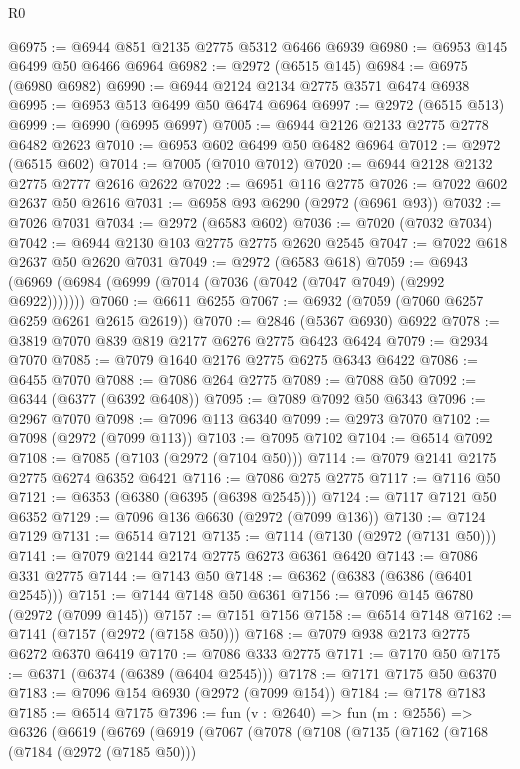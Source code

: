 \begin{lexlean}{R0}
\begin{coremodule}
@6975 := @6944 @851 @2135 @2775 @5312 @6466 @6939
@6980 := @6953 @145 @6499 @50 @6466 @6964
@6982 := @2972 (@6515 @145)
@6984 := @6975 (@6980 @6982)
@6990 := @6944 @2124 @2134 @2775 @3571 @6474 @6938
@6995 := @6953 @513 @6499 @50 @6474 @6964
@6997 := @2972 (@6515 @513)
@6999 := @6990 (@6995 @6997)
@7005 := @6944 @2126 @2133 @2775 @2778 @6482 @2623
@7010 := @6953 @602 @6499 @50 @6482 @6964
@7012 := @2972 (@6515 @602)
@7014 := @7005 (@7010 @7012)
@7020 := @6944 @2128 @2132 @2775 @2777 @2616 @2622
@7022 := @6951 @116 @2775
@7026 := @7022 @602 @2637 @50 @2616
@7031 := @6958 @93 @6290 (@2972 (@6961 @93))
@7032 := @7026 @7031
@7034 := @2972 (@6583 @602)
@7036 := @7020 (@7032 @7034)
@7042 := @6944 @2130 @103 @2775 @2775 @2620 @2545
@7047 := @7022 @618 @2637 @50 @2620 @7031
@7049 := @2972 (@6583 @618)
@7059 := @6943 (@6969 (@6984 (@6999 (@7014 (@7036 (@7042 (@7047 @7049) (@2992 @6922)))))))
@7060 := @6611 @6255
@7067 := @6932 (@7059 (@7060 @6257 @6259 @6261 @2615 @2619))
@7070 := @2846 (@5367 @6930) @6922
@7078 := @3819 @7070 @839 @819 @2177 @6276 @2775 @6423 @6424
@7079 := @2934 @7070
@7085 := @7079 @1640 @2176 @2775 @6275 @6343 @6422
@7086 := @6455 @7070
@7088 := @7086 @264 @2775
@7089 := @7088 @50
@7092 := @6344 (@6377 (@6392 @6408))
@7095 := @7089 @7092 @50 @6343
@7096 := @2967 @7070
@7098 := @7096 @113 @6340
@7099 := @2973 @7070
@7102 := @7098 (@2972 (@7099 @113))
@7103 := @7095 @7102
@7104 := @6514 @7092
@7108 := @7085 (@7103 (@2972 (@7104 @50)))
@7114 := @7079 @2141 @2175 @2775 @6274 @6352 @6421
@7116 := @7086 @275 @2775
@7117 := @7116 @50
@7121 := @6353 (@6380 (@6395 (@6398 @2545)))
@7124 := @7117 @7121 @50 @6352
@7129 := @7096 @136 @6630 (@2972 (@7099 @136))
@7130 := @7124 @7129
@7131 := @6514 @7121
@7135 := @7114 (@7130 (@2972 (@7131 @50)))
@7141 := @7079 @2144 @2174 @2775 @6273 @6361 @6420
@7143 := @7086 @331 @2775
@7144 := @7143 @50
@7148 := @6362 (@6383 (@6386 (@6401 @2545)))
@7151 := @7144 @7148 @50 @6361
@7156 := @7096 @145 @6780 (@2972 (@7099 @145))
@7157 := @7151 @7156
@7158 := @6514 @7148
@7162 := @7141 (@7157 (@2972 (@7158 @50)))
@7168 := @7079 @938 @2173 @2775 @6272 @6370 @6419
@7170 := @7086 @333 @2775
@7171 := @7170 @50
@7175 := @6371 (@6374 (@6389 (@6404 @2545)))
@7178 := @7171 @7175 @50 @6370
@7183 := @7096 @154 @6930 (@2972 (@7099 @154))
@7184 := @7178 @7183
@7185 := @6514 @7175
@7396 := fun (v : @2640) =>
  fun (m : @2556) =>
  @6326
    (@6619
      (@6769
        (@6919
          (@7067
            (@7078
              (@7108
                (@7135
                  (@7162
                    (@7168
                      (@7184 (@2972 (@7185 @50)))

\end{coremodule}
\end{lexlean}
